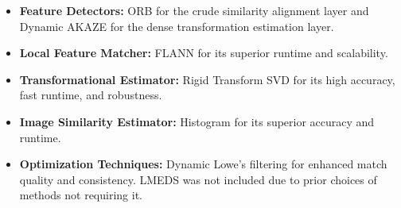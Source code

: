 \begin{itemize}
    \item \textbf{Feature Detectors:} ORB for the crude similarity alignment layer and Dynamic AKAZE for the dense transformation estimation layer.
    \item \textbf{Local Feature Matcher:} FLANN for its superior runtime and scalability.
    \item \textbf{Transformational Estimator:} Rigid Transform SVD for its high accuracy, fast runtime, and robustness.
    \item \textbf{Image Similarity Estimator:} Histogram for its superior accuracy and runtime.
    \item \textbf{Optimization Techniques:} Dynamic Lowe's filtering for enhanced match quality and consistency. LMEDS was not included due to prior choices of methods not requiring it.
\end{itemize}